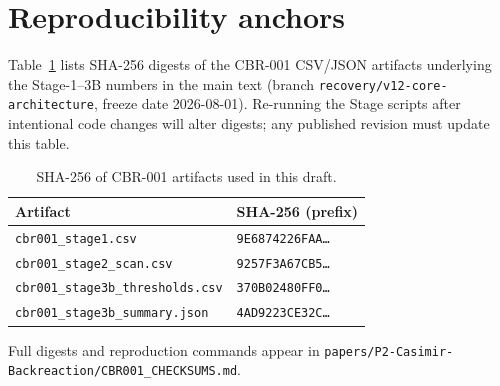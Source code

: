 \documentclass[aps,prd,reprint,superscriptaddress,nofootinbib,floatfix]{revtex4-2}
\begin{document}
\section{Reproducibility anchors}
\label{app:checksums}

Table~\ref{tab:checksums} lists SHA-256 digests of the CBR-001 CSV/JSON
artifacts underlying the Stage-1--3B numbers in the main text (branch
\texttt{recovery/v12-core-architecture}, freeze date 2026-08-01).
Re-running the Stage scripts after intentional code changes will alter digests;
any published revision must update this table.

\begin{table}[h]
\caption{SHA-256 of CBR-001 artifacts used in this draft.}
\label{tab:checksums}
\begin{ruledtabular}
\begin{tabular}{ll}
Artifact & SHA-256 (prefix) \\
\hline
\texttt{cbr001\_stage1.csv} & \texttt{9E6874226FAA\ldots} \\
\texttt{cbr001\_stage2\_scan.csv} & \texttt{9257F3A67CB5\ldots} \\
\texttt{cbr001\_stage3b\_thresholds.csv} & \texttt{370B02480FF0\ldots} \\
\texttt{cbr001\_stage3b\_summary.json} & \texttt{4AD9223CE32C\ldots} \\
\end{tabular}
\end{ruledtabular}
\end{table}

Full digests and reproduction commands appear in
\texttt{papers/P2-Casimir-Backreaction/CBR001\_CHECKSUMS.md}.


\end{document}
